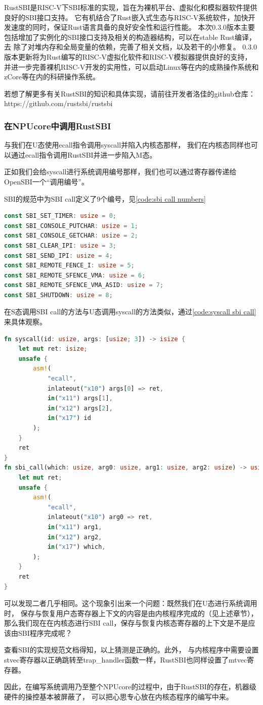 RustSBI是RISC-V下SBI标准的实现，旨在为裸机平台、虚拟化和模拟器软件提供良好的SBI接口支持。
它有机结合了Rust嵌入式生态与RISC-V系统软件，加快开发速度的同时，保证Rust语言具备的良好安全性和运行性能。
本次0.3.0版本主要包括增加了实例化的SBI接口支持及相关的构造器结构，可以在stable Rust编译，去
除了对堆内存和全局变量的依赖，完善了相关文档，以及若干的小修复。
0.3.0版本更新将为Rust编写的RISC-V虚拟化软件和RISC-V模拟器提供良好的支持，
并进一步完善裸机RISC-V开发的实用性，可以启动Linux等在内的成熟操作系统和zCore等在内的科研操作系统。

若想了解更多有关RustSBI的知识和具体实现，请前往开发者洛佳的github仓库：
https://github.com/rustsbi/rustsbi

\subsubsection{在NPUcore中调用RustSBI}

与我们在U态使用ecall指令调用syscall并陷入内核态那样，
我们在内核态同样也可以通过ecall指令调用RustSBI并进一步陷入M态。

正如我们会给syscall进行系统调用编号那样，我们也可以通过寄存器传递给OpenSBI一个“调用编号”。

SBI的规范中为SBI call定义了9个编号，见\autoref{code:sbi call numbers}

\begin{lstlisting}[language={Rust}, label={code:sbi call numbers},
    caption={SBI call 调用编号}]
const SBI_SET_TIMER: usize = 0;
const SBI_CONSOLE_PUTCHAR: usize = 1;
const SBI_CONSOLE_GETCHAR: usize = 2;
const SBI_CLEAR_IPI: usize = 3;
const SBI_SEND_IPI: usize = 4;
const SBI_REMOTE_FENCE_I: usize = 5;
const SBI_REMOTE_SFENCE_VMA: usize = 6;
const SBI_REMOTE_SFENCE_VMA_ASID: usize = 7;
const SBI_SHUTDOWN: usize = 8;
\end{lstlisting}

在S态调用SBI call的方法与U态调用syscall的方法类似，通过\autoref{code:syscall sbi call}来具体观察。

\begin{lstlisting}[language={Rust}, label={code:syscall sbi call},
    caption={syscall与SBI call对比}]
fn syscall(id: usize, args: [usize; 3]) -> isize {
    let mut ret: isize;
    unsafe {
        asm!(
            "ecall",
            inlateout("x10") args[0] => ret,
            in("x11") args[1],
            in("x12") args[2],
            in("x17") id
        );
    }
    ret
}
fn sbi_call(which: usize, arg0: usize, arg1: usize, arg2: usize) -> usize {
    let mut ret;
    unsafe {
        asm!(
            "ecall",
            inlateout("x10") arg0 => ret,
            in("x11") arg1,
            in("x12") arg2,
            in("x17") which,
        );
    }
    ret
}
\end{lstlisting}

可以发现二者几乎相同。这个现象引出来一个问题：既然我们在U态进行系统调用时，
保存与恢复用户态寄存器上下文的内容是由内核程序完成的（见上述章节），
那么我们现在在内核态进行SBI call，保存与恢复内核态寄存器的上下文是不是应该由SBI程序完成呢？

查看SBI的实现规范文档得知，以上猜测是正确的。此外，
与内核程序中需要设置stvec寄存器以正确跳转至trap_handler函数一样，RustSBI也同样设置了mtvec寄存器。

因此，在编写系统调用乃至整个NPUcore的过程中，由于RustSBI的存在，机器级硬件的操控基本被屏蔽了，
可以把心思专心放在内核态程序的编写中来。